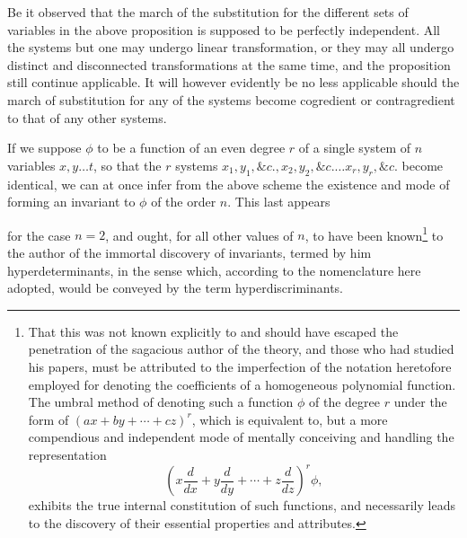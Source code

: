 \documentclass[11pt]{article}
\newcommand{\sourcepage}[1]{\marginpar{\scriptsize p.~#1}}
\begin{document}
{{Be it observed that the march of the substitution for the different sets of variables in the above proposition is supposed to be perfectly independent. All the systems but one may undergo linear transformation, or they may all undergo distinct and disconnected transformations at the same time, and the proposition still continue applicable. It will however evidently be no less applicable should the march of substitution for any of the systems become cogredient or contragredient to that of any other systems.

If we suppose $\phi$ to be a function of an even degree $r$ of a single system of $n$ variables $x,y\ldots t$, so that the $r$ systems $x_1,y_1,\&c., x_2,y_2,\&c.\ldots x_r,y_r,\&c.$ become identical, we can at once infer from the above scheme the existence and mode of forming an invariant to $\phi$ of the order $n$. This last appears

\sourcepage{308}
for the case $n=2$, and ought, for all other values of $n$, to have been known\footnote{That this was not known explicitly to and should have escaped the penetration of the sagacious author of the theory, and those who had studied his papers, must be attributed to the imperfection of the notation heretofore employed for denoting the coefficients of a homogeneous polynomial function. The umbral method of denoting such a function $\phi$ of the degree $r$ under the form of $(ax+by+\cdots+cz)^r$, which is equivalent to, but a more compendious and independent mode of mentally conceiving and handling the representation
\[
\left(x\frac{d}{dx}+y\frac{d}{dy}+\cdots+z\frac{d}{dz}\right)^r\phi,
\]
exhibits the true internal constitution of such functions, and necessarily leads to the discovery of their essential properties and attributes.} to the author of the immortal discovery of invariants, termed by him hyperdeterminants, in the sense which, according to the nomenclature here adopted, would be conveyed by the term hyperdiscriminants.

}}
\end{document}
